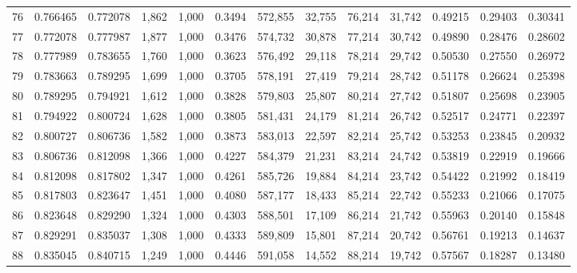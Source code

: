 \begin{tabular}{rrrrrrrrrrrrr}
76  &  0.766465 &  0.772078 &   1,862 &  1,000 &                                     0.3494 &  572,855 &   32,755 &   76,214 &   31,742 &  0.49215 &  0.29403 &  0.30341 \\
77  &  0.772078 &  0.777987 &   1,877 &  1,000 &                                     0.3476 &  574,732 &   30,878 &   77,214 &   30,742 &  0.49890 &  0.28476 &  0.28602 \\
78  &  0.777989 &  0.783655 &   1,760 &  1,000 &                                     0.3623 &  576,492 &   29,118 &   78,214 &   29,742 &  0.50530 &  0.27550 &  0.26972 \\
79  &  0.783663 &  0.789295 &   1,699 &  1,000 &                                     0.3705 &  578,191 &   27,419 &   79,214 &   28,742 &  0.51178 &  0.26624 &  0.25398 \\
80  &  0.789295 &  0.794921 &   1,612 &  1,000 &                                     0.3828 &  579,803 &   25,807 &   80,214 &   27,742 &  0.51807 &  0.25698 &  0.23905 \\
81  &  0.794922 &  0.800724 &   1,628 &  1,000 &                                     0.3805 &  581,431 &   24,179 &   81,214 &   26,742 &  0.52517 &  0.24771 &  0.22397 \\
82  &  0.800727 &  0.806736 &   1,582 &  1,000 &                                     0.3873 &  583,013 &   22,597 &   82,214 &   25,742 &  0.53253 &  0.23845 &  0.20932 \\
83  &  0.806736 &  0.812098 &   1,366 &  1,000 &                                     0.4227 &  584,379 &   21,231 &   83,214 &   24,742 &  0.53819 &  0.22919 &  0.19666 \\
84  &  0.812098 &  0.817802 &   1,347 &  1,000 &                                     0.4261 &  585,726 &   19,884 &   84,214 &   23,742 &  0.54422 &  0.21992 &  0.18419 \\
85  &  0.817803 &  0.823647 &   1,451 &  1,000 &                                     0.4080 &  587,177 &   18,433 &   85,214 &   22,742 &  0.55233 &  0.21066 &  0.17075 \\
86  &  0.823648 &  0.829290 &   1,324 &  1,000 &                                     0.4303 &  588,501 &   17,109 &   86,214 &   21,742 &  0.55963 &  0.20140 &  0.15848 \\
87  &  0.829291 &  0.835037 &   1,308 &  1,000 &                                     0.4333 &  589,809 &   15,801 &   87,214 &   20,742 &  0.56761 &  0.19213 &  0.14637 \\
88  &  0.835045 &  0.840715 &   1,249 &  1,000 &                                     0.4446 &  591,058 &   14,552 &   88,214 &   19,742 &  0.57567 &  0.18287 &  0.13480 \\

\end{tabular}
